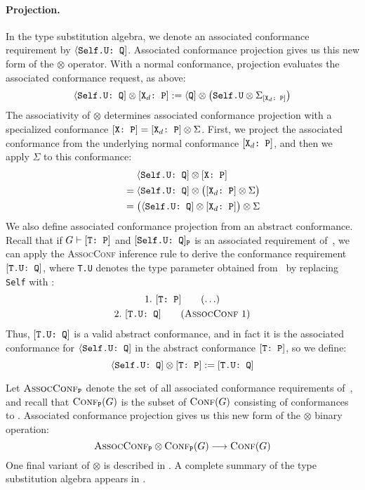 \documentclass[../generics]{subfiles}
\begin{document}
\paragraph{Projection.}
In the type substitution algebra, we denote an associated conformance requirement by $\langle\texttt{Self.U:~Q}]$. Associated conformance projection gives us this new form of the $\otimes$ operator. With a normal conformance, projection evaluates the associated conformance request, as above:
\[\langle\texttt{Self.U:~Q}] \otimes [\texttt{$\texttt{X}_d$:~P}] := \langle\texttt{Q}] \otimes \big(\texttt{Self.U} \otimes \Sigma_{[\texttt{$\texttt{X}_d$:~P}]}\big)\]
The associativity of $\otimes$ determines associated conformance projection with a specialized conformance $[\texttt{X:~P}]=[\texttt{$\texttt{X}_d$:~P}]\otimes\Sigma$. First, we project the associated conformance from the underlying normal conformance $[\texttt{$\texttt{X}_d$:~P}]$, and then we apply $\Sigma$ to this conformance:
\begin{gather*}
\langle\texttt{Self.U:~Q}]\otimes[\texttt{X:~P}]\\
\qquad {} = \langle\texttt{Self.U:~Q}]\otimes\bigl([\texttt{$\texttt{X}_d$:~P}]\otimes\Sigma\bigr)\\
\qquad {} = \bigl(\langle\texttt{Self.U:~Q}]\otimes[\texttt{$\texttt{X}_d$:~P}]\bigr)\otimes\Sigma
\end{gather*}
We also define associated conformance projection from an abstract conformance. Recall that if $G\vdash[\texttt{T:~P}]$ and $[\texttt{Self.U:~Q}]_{\texttt{P}}$ is an associated requirement of~\tP, we can apply the \textsc{AssocConf} inference rule to derive the conformance requirement $[\texttt{T.U:~Q}]$, where \texttt{T.U} denotes the type parameter obtained from \SelfU\ by replacing \texttt{Self} with \tT:
\begin{gather*}
\AnyStep{\TP}{1}\\
\AssocConfStep{1}{T.U}{Q}{2}
\end{gather*}
Thus, $[\texttt{T.U:~Q}]$ is a valid abstract conformance, and in fact it is the associated conformance for $\langle\texttt{Self.U:~Q}]$ in the abstract conformance $[\texttt{T:~P}]$, so we define:
\[
\langle\texttt{Self.U:~Q}] \otimes [\texttt{T:~P}] := [\texttt{T.U:~Q}]
\]

Let $\textsc{AssocConf}_{\texttt{P}}$ denote the set of all associated conformance requirements of~\tP, and recall that $\textsc{Conf}_{\texttt{P}}({G})$ is the subset of $\textsc{Conf}({G})$ consisting of conformances to \tP. Associated conformance projection gives us this new form of the \index{$\otimes$}$\otimes$ binary operation:
\[\textsc{AssocConf}_{\texttt{P}}\otimes\textsc{Conf}_{\texttt{P}}({G})\longrightarrow\textsc{Conf}({G})\]
One final variant of $\otimes$ is described in . A complete summary of the type substitution algebra appears in .
\end{document}
